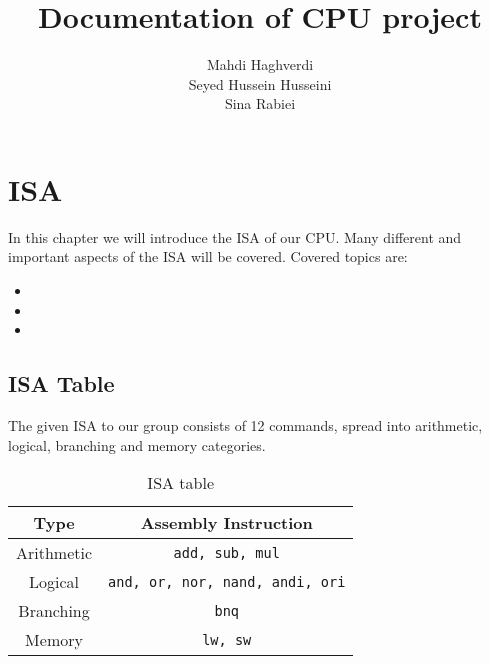 \documentclass[12pt, dvipsnames, svgnames, x11names, oneside]{book}
\title{Documentation of CPU project}
\author{
	Mahdi Haghverdi \\
	Seyed Hussein Husseini \\
	Sina Rabiei
}
\newenvironment{sansserif}{\sffamily}{\normalfont}
\begin{document}
	\maketitle
	\frontmatter
	\tableofcontents
	\mainmatter
	
	\chapter{ISA}\label{ch:isa}
		\begin{sansserif}
			In this chapter we will introduce the ISA of our CPU. Many different and important aspects of the ISA will be covered. Covered topics are:
            \begin{itemize}
				\item {}
				\item {}
				\item {}
			\end{itemize}
		\end{sansserif}
				
		\section{ISA Table}\label{sec:isa-table}
			The given ISA to our group consists of 12 commands, spread into arithmetic, logical, branching and memory categories.
			
			\begin{table}[hb]
				\caption{ISA table}
				\begin{center}
					\begin{tabular}{|c|c|}
						\hline
						Type & Assembly Instruction \\
						\hline
						\hline
						Arithmetic & \texttt{add, sub, mul} \\
						\hline
						Logical & \texttt{and, or, nor, nand, andi, ori} \\
						\hline
						Branching & \texttt{bnq} \\
						\hline
						Memory & \texttt{lw, sw} \\
						\hline
					\end{tabular}
				\end{center}
			\end{table}\label{sec:table:isa-table}
		
\end{document}
